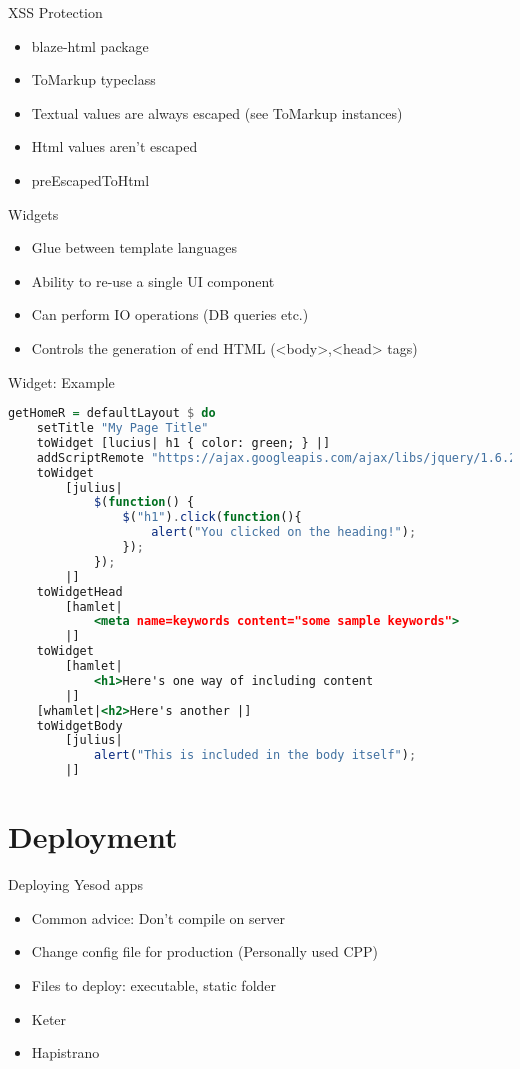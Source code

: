 \documentclass{beamer}
\begin{document}
\begin{frame}{XSS Protection}
  \begin{itemize}
  \item blaze-html package
  \item ToMarkup typeclass
  \item Textual values are always escaped (see ToMarkup instances)
  \item Html values aren't escaped
  \item preEscapedToHtml
  \end{itemize}
\end{frame}

\begin{frame}{Widgets}
\begin{itemize}
\item Glue between template languages
\item Ability to re-use a single UI component
\item Can perform IO operations (DB queries etc.)
\item Controls the generation of end HTML (<body>,<head> tags)
\end{itemize}
\end{frame}

\begin{frame}[fragile]{Widget: Example}
  \begin{lstlisting}[language=haskell,basicstyle=\tiny]
getHomeR = defaultLayout $ do
    setTitle "My Page Title"
    toWidget [lucius| h1 { color: green; } |]
    addScriptRemote "https://ajax.googleapis.com/ajax/libs/jquery/1.6.2/jquery.min.js"
    toWidget
        [julius|
            $(function() {
                $("h1").click(function(){
                    alert("You clicked on the heading!");
                });
            });
        |]
    toWidgetHead
        [hamlet|
            <meta name=keywords content="some sample keywords">
        |]
    toWidget
        [hamlet|
            <h1>Here's one way of including content
        |]
    [whamlet|<h2>Here's another |]
    toWidgetBody
        [julius|
            alert("This is included in the body itself");
        |]  
\end{lstlisting}
\end{frame}

\section{Deployment}

\begin{frame}{Deploying Yesod apps}
  \begin{itemize}
  \item Common advice: Don't compile on server
  \item Change config file for production (Personally used CPP)
  \item Files to deploy: executable, static folder
  \item Keter
  \item Hapistrano
  \end{itemize}
\end{frame}
\end{document}
